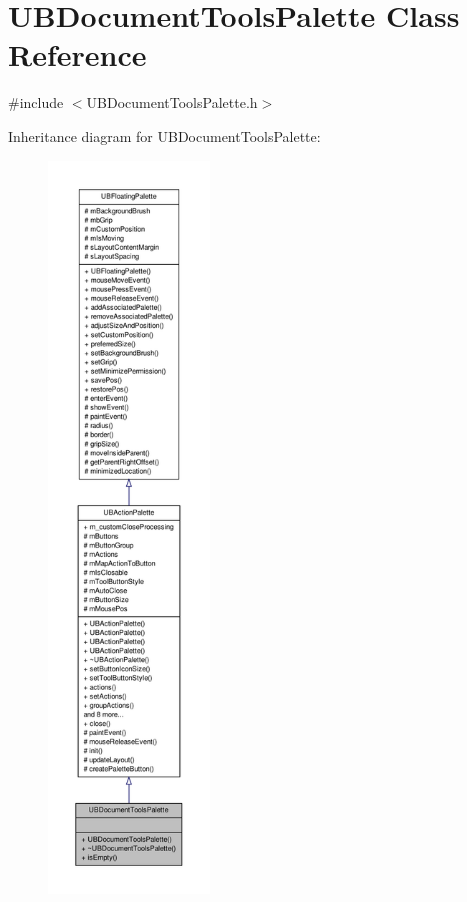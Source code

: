 \hypertarget{class_u_b_document_tools_palette}{\section{U\-B\-Document\-Tools\-Palette Class Reference}
\label{d9/dee/class_u_b_document_tools_palette}
}


{\ttfamily \#include $<$U\-B\-Document\-Tools\-Palette.\-h$>$}



Inheritance diagram for U\-B\-Document\-Tools\-Palette\-:
\nopagebreak
\begin{figure}[H]
\begin{center}
\leavevmode
\includegraphics[height=550pt]{db/d59/class_u_b_document_tools_palette__inherit__graph}
\end{center}
\end{figure}


